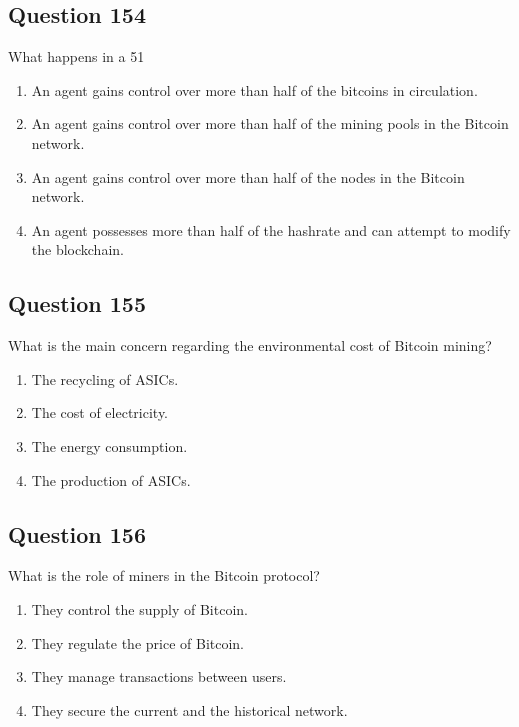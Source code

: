 \documentclass[12pt,a4paper]{article}
\begin{document}
\bigskip


\subsection*{Question 154}
What happens in a 51%

\begin{enumerate}[label=\Alph*., leftmargin=*]
\item An agent gains control over more than half of the bitcoins in circulation.
\item An agent gains control over more than half of the mining pools in the Bitcoin network.
\item An agent gains control over more than half of the nodes in the Bitcoin network.
\item An agent possesses more than half of the hashrate and can attempt to modify the blockchain.
\end{enumerate}

\bigskip


\subsection*{Question 155}
What is the main concern regarding the environmental cost of Bitcoin mining?

\begin{enumerate}[label=\Alph*., leftmargin=*]
\item The recycling of ASICs.
\item The cost of electricity.
\item The energy consumption.
\item The production of ASICs.
\end{enumerate}

\bigskip


\subsection*{Question 156}
What is the role of miners in the Bitcoin protocol?

\begin{enumerate}[label=\Alph*., leftmargin=*]
\item They control the supply of Bitcoin.
\item They regulate the price of Bitcoin.
\item They manage transactions between users.
\item They secure the current and the historical network.
\end{enumerate}
\end{document}
